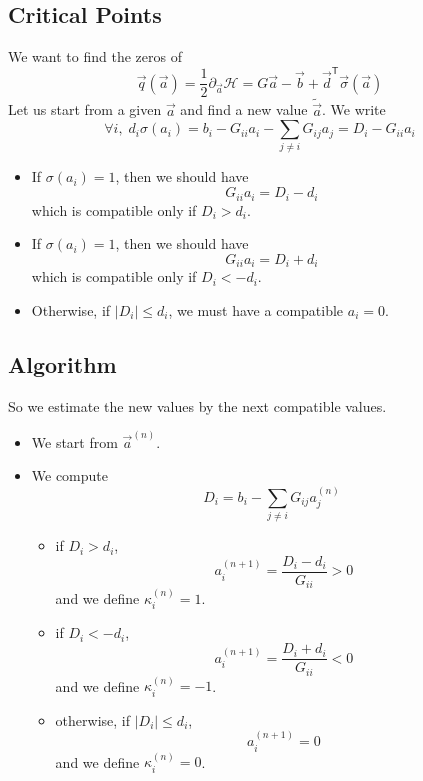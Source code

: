 \documentclass{revtex4}
\newcommand{\abs}[1]{\left|#1\right|}
\newcommand{\trn}[1]{{#1}^{\mathsf{T}}}
\begin{document}
\subsection{Critical Points}

We want to find the zeros of
\begin{equation}
	\vec{q}\left(\vec{a}\right) = \dfrac{1}{2} \partial_{\vec{a}} \mathcal{H} = G\vec{a} - \vec{b} + \trn{\vec{d}}\vec{\sigma}\left(\vec{a}\right)
\end{equation}
Let us start from a given $\vec{a}$ and find a new value $\tilde{\vec{a}}$.
We write
\begin{equation}
	\forall i, \; d_i \sigma\left(a_i\right) =  b_i  - G_{ii}a_i - \sum_{j\not=i} G_{ij} a_j = D_i - G_{ii}a_i
\end{equation}

\begin{itemize}
	\item If $\sigma\left(a_i\right)=1$, then we should have
		\begin{equation}
			G_{ii} a_i = D_i - d_i
		\end{equation}
		which is compatible only if $D_i>d_i$.
	\item If $\sigma\left(a_i\right)=1$, then we should have
	\begin{equation}
		G_{ii} a_i = D_i + d_i
	\end{equation}
	which is compatible only if $D_i<-d_i$.
	\item Otherwise, if $\abs{D_i}\leq d_i$, we must have a compatible $a_i=0$.
\end{itemize}

\subsection{Algorithm}
So we estimate the new values by the next compatible values.

\begin{itemize}
	\item We start from ${\vec{a}}^{(n)}$.
	\item We compute
		\begin{equation}
			D_i = b_i - \sum_{j\not=i} G_{ij}a_j^{(n)}
		\end{equation}
	\begin{itemize}
		\item if $D_i>d_i$, 
			\begin{equation}
				a_i^{(n+1)} = \dfrac{D_i-d_i}{G_{ii}} > 0
			\end{equation}
			and we define $\kappa_i^{(n)}=1$.
		\item if $D_i<-d_i$,
			\begin{equation}
				a_i^{(n+1)} = \dfrac{D_i+d_i}{G_{ii}} < 0
			\end{equation}
			and we define $\kappa_i^{(n)}=-1$.
		\item otherwise, if $\abs{D_i}\leq d_i$, 
			\begin{equation}
				a_i^{(n+1)} = 0
			\end{equation}
		and we define $\kappa_i^{(n)}=0$.
	\end{itemize}
\end{itemize}
\end{document}
